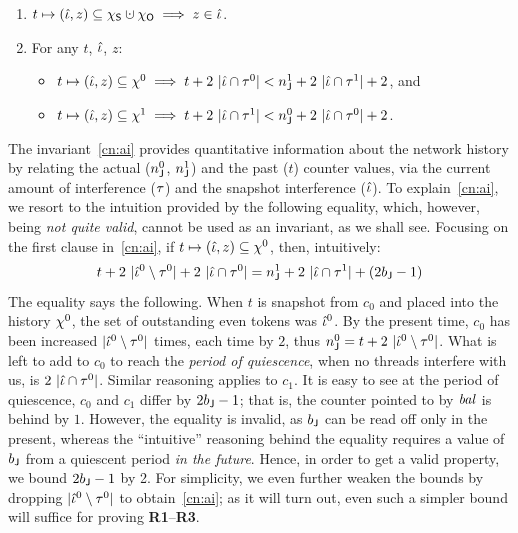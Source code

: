 \begin{enumerate}[label=(\roman*)]

\item\label{cn:ti1}
%
  $t \mapsto (\tknh, z) \subseteq \hists \hunion \histo
  \implies z \in \tknh$. \\[-7pt]

\item\label{cn:ai} 
%
For any $t$, $\hat{\iota}$, $z$: \\[-7pt]
% 
{\small
  \begin{itemize}
  \item   $t \mapsto (\hat{\iota}, z) \subseteq \chi^0 \implies t + 2\ |\hat{\iota}
    \cap \tau^0| < n^1_{\mathsf{J}} + 2\ |\hat{\iota} \cap \tau^1| + 2$, and \\[-7pt]
  \item
    $t \mapsto (\hat{\iota}, z) \subseteq \chi^1 \implies t + 2\ |\hat{\iota} \cap 
    \tau^1| < n^0_{\mathsf{J}} + 2\ |\hat{\iota} \cap \tau^0|
    + 2$.
  \end{itemize}
}
%
\end{enumerate}
\vspace{5pt}
 
\noindent
The invariant~\ref{cn:ai} provides quantitative information about the
network history by relating the actual ($n^0_{\mathsf{J}}$, $n^1_{\mathsf{J}}$)
and the past ($t$) counter values, via the current amount of
interference ($\tau$) and the snapshot interference ($\hat{\iota}$).
%
To explain~\ref{cn:ai}, we resort to the intuition provided by the
following equality, which, however, being \emph{not quite valid},
cannot be used as an invariant, as we shall see. Focusing on the
first clause in~\ref{cn:ai}, if
$t \mapsto (\hat{\iota}, z) \subseteq \chi^0$, then,
intuitively:
%
%
%
{\small{
\[
t + 2\ |\tknh^0 \setminus \tkn^0 | + 2\ |\tknh \cap \tkn^0| =
n^1_\joint + 2\ |\tknh \cap \tkn^1| + (2 b_\joint - 1)
\]}}
%
%
\noindent
The equality says the following. When $t$ is snapshot from $c_0$ and
placed into the history $\chi^0$, the set of outstanding even tokens
was $\hat{\iota}^0$. By the present time, $c_0$ has been increased
$|\hat{\iota}^0 \setminus \tau^0|$ times, each time by $2$, thus
$n^0_{\mathsf{J}} = t + 2\ |\hat{\iota}^0 \setminus \tau^0|$. What is left to add
to $c_0$ to reach the \emph{period of quiescence}, when no threads
interfere with us, is $2\ |\hat{\iota} \cap \tau^0|$. Similar reasoning
applies to $c_1$. It is easy to see at the period of quiescence, $c_0$
and $c_1$ differ by $2 b_{\mathsf{J}} - 1$; that is, the counter pointed to
by $\mathit{bal}$ is behind by $1$. However, the equality is invalid, as
$b_{\mathsf{J}}$ can be read off only in the present, whereas the
``intuitive'' reasoning behind the equality requires a value of
$b_{\mathsf{J}}$ from a quiescent period \emph{in the future}. Hence, in
order to get a valid property, we bound $2 b_{\mathsf{J}} - 1$ by 2. For
simplicity, we even further weaken the bounds by dropping
$|\hat{\iota}^0 \setminus \tau^0|$ to obtain~\ref{cn:ai}; as it will turn
out, even such a simpler bound will suffice for proving
\textbf{R1}--\textbf{R3}.

